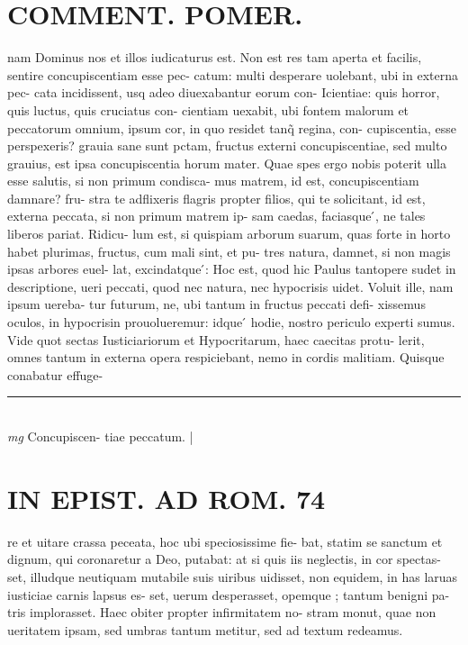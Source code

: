 \documentclass{article}
\begin{document}
\begin{pages}
\section*{COMMENT. POMER.  }\pstart nam Dominus nos et illos iudicaturus est. Non est res tam aperta et facilis, sentire concupiscentiam esse pec- catum: multi desperare uolebant, ubi in externa pec- cata incidissent, usq adeo diuexabantur eorum con- Icientiae: quis horror, quis luctus, quis cruciatus con- cientiam uexabit, ubi fontem malorum et peccatorum omnium, ipsum cor, in quo residet tanq̃ regina, con- cupiscentia, esse perspexeris? grauia sane sunt pctam, fructus externi concupiscentiae, sed multo grauius, est ipsa concupiscentia horum mater. Quae spes ergo nobis poterit ulla esse salutis, si non primum condisca- mus matrem, id est, concupiscentiam damnare? fru- stra te adflixeris flagris propter filios, qui te solicitant, id est, externa peccata, si non primum matrem ip- sam caedas, faciasque ́, ne tales liberos pariat. Ridicu- lum est, si quispiam arborum suarum, quas forte in horto habet plurimas, fructus, cum mali sint, et pu- tres natura, damnet, si non magis ipsas arbores euel- lat, excindatque ́: Hoc est, quod hic Paulus tantopere sudet in descriptione, ueri peccati, quod nec natura, nec hypocrisis uidet. Voluit ille, nam ipsum uereba- tur futurum, ne, ubi tantum in fructus peccati defi- xissemus oculos, in hypocrisin prouolueremur: idque ́ hodie, nostro periculo experti sumus. Vide quot sectas Iusticiariorum et Hypocritarum, haec caecitas protu- lerit, omnes tantum in externa opera respiciebant, nemo in cordis malitiam. Quisque conabatur effuge-  \pend
\vspace{0.5cm}\noindent
\vspace{0.2cm}\rule{1cm}{0.2pt}\\ 
\hspace{0.2cm}\textit{mg}
\footnotesize Concupiscen- tiae peccatum.  
\normalsize| 
\section*{IN EPIST. AD ROM.  74 }
\marginpar{[ p.]}\pstart re et uitare crassa peceata, hoc ubi speciosissime fie- bat, statim se sanctum et dignum, qui coronaretur a Deo, putabat: at si quis iis neglectis, in cor spectas- set, illudque neutiquam mutabile suis uiribus uidisset, non equidem, in has laruas iusticiae carnis lapsus es- set, uerum desperasset, opemque ; tantum benigni pa- tris implorasset. Haec obiter propter infirmitatem no- stram monut, quae non ueritatem ipsam, sed umbras tantum metitur, sed ad textum redeamus.   \pend
{}
{}

\end{pages}
\end{document}
